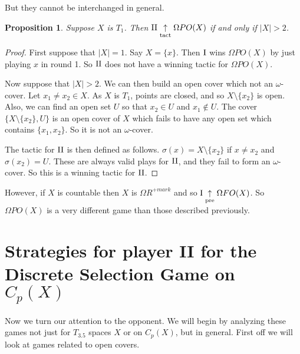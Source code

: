 \documentclass{amsart}
\theoremstyle{plain}
\newtheorem{proposition}[theorem]{Proposition}
\theoremstyle{definition}
\theoremstyle{remark}
\theoremstyle{plain}
\theoremstyle{definition}
\theoremstyle{remark}
\begin{document}
But they cannot be interchanged in general.
\begin{proposition}
  Suppose \(X\) is \(T_1\).
  Then \(\mathrm{II}\underset{\text{tact}}{\uparrow}\Omega PO(X)\) if and only if \(|X| > 2\).
\end{proposition}
\begin{proof}
  First suppose that \(|X| = 1 \).
  Say \(X = \{x\}\).
  Then \(\mathrm{I}\) wins \(\Omega PO(X)\) by just playing \(x\) in round 1.
  So \(\mathrm{II}\) does not have a winning tactic for \(\Omega PO(X)\).
  
  Now suppose that \(|X| > 2\).
  We can then build an open cover which not an \(\omega\)-cover.
  Let \(x_1 \neq x_2 \in X\).
  As \(X\) is \(T_1\), points are closed, and so \(X \setminus \{x_2\}\) is open.
  Also, we can find an open set \(U\) so that \(x_2 \in U\) and \(x_1 \notin U\).
  The cover \(\{X \setminus \{x_2\}, U\}\) is an open cover of \(X\) which fails to have any open set which contains \(\{x_1,x_2\}\).
  So it is not an \(\omega\)-cover.
  
  The tactic for \(\mathrm{II}\) is then defined as follows.
  \(\sigma(x) = X \setminus \{x_2\}\) if \(x \neq x_2\) and \(\sigma(x_2) = U\).
  These are always valid plays for \(\mathrm{II}\), and they fail to form an \(\omega\)-cover.
  So this is a winning tactic for \(\mathrm{II}\).
\end{proof}

However, if \(X\) is countable then \(X\) is \(\Omega R^{+mark}\) and so \(\mathrm{I}\underset{\text{pre}}{\uparrow} \Omega FO(X)\). 
So \(\Omega PO(X)\) is a very different game than those described previously.

\section{Strategies for player II for the Discrete Selection Game on \(C_p(X)\)}

Now we turn our attention to the opponent.
We will begin by analyzing these games not just for \(T_{3.5}\) spaces \(X\) or on \(C_p(X)\), but in general.
First off we will look at games related to open covers.
\end{document}
